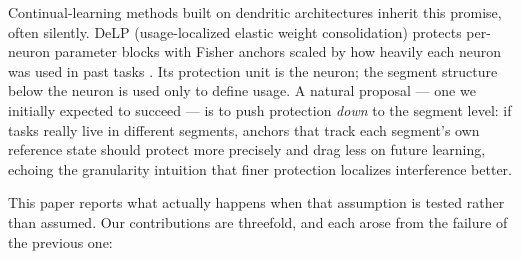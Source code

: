 \documentclass[review,12pt,number]{elsarticle}
\newcommand{\delp}{DeLP}
\begin{document}
Continual-learning methods built on dendritic architectures inherit this
promise, often silently. \delp{} (usage-localized elastic weight
consolidation) protects per-neuron parameter blocks with Fisher anchors
scaled by how heavily each neuron was used in past tasks
\cite{zhou2026delp,kirkpatrick2017}. Its protection unit is the neuron; the
segment structure below the neuron is used only to define usage. A natural
proposal --- one we initially expected to succeed --- is to push protection
\emph{down} to the segment level: if tasks really live in different segments,
anchors that track each segment's own reference state should protect more
precisely and drag less on future learning, echoing the granularity
intuition that finer protection localizes interference better.

This paper reports what actually happens when that assumption is tested
rather than assumed. Our contributions are threefold, and each arose from the
failure of the previous one:
\end{document}

